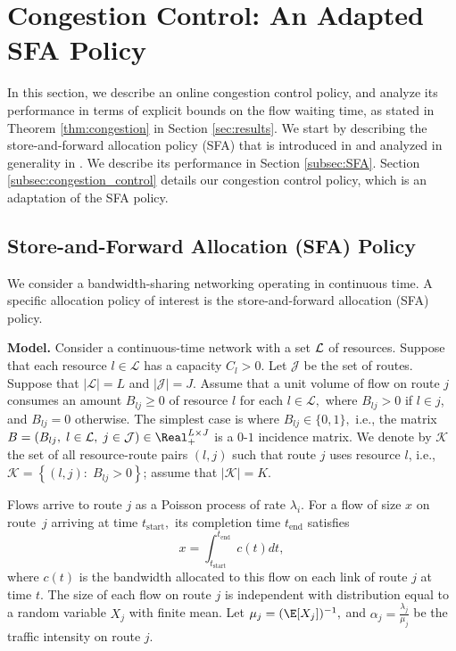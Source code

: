 
\section{Congestion Control: An Adapted SFA Policy \label{sec:congestion_control}}

In this section, we describe an online congestion control policy,
and analyze its performance in terms of explicit bounds on the flow
waiting time, as stated in Theorem \ref{thm:congestion} in Section
\ref{sec:results}. We start by describing the 
store-and-forward allocation policy (SFA) that is introduced in \cite{proutiere_thesis}
and analyzed in generality in \cite{bonald2003insensitive}. We describe
its performance in Section \ref{subsec:SFA}. 
Section \ref{subsec:congestion_control} details our congestion control 
policy, which is an adaptation of the SFA policy.

\subsection{Store-and-Forward Allocation (SFA) Policy\label{subsec:SFA}}

We consider a bandwidth-sharing networking operating in continuous
time. A specific allocation policy of interest is the store-and-forward
allocation (SFA) policy. 

\medskip
\noindent\textbf{Model. }Consider a continuous-time network with a set $\text{\ensuremath{\mathcal{L}}}$
of resources. Suppose that each resource $l\in\mathcal{\mathcal{L}}$
has a capacity $C_{l}>0.$ Let $\mathcal{J}$ be the set of routes.
Suppose that $|\mathcal{L}|=L$ and $|\mathcal{J}|=J$.
Assume that a unit volume of flow on route $j$ consumes an amount
$B_{lj}\geq0$ of resource $l$ for each $l\in\mathcal{L}, $ where
$B_{lj}>0$ if $l\in j$, and $B_{lj}=0$ otherwise. The simplest
case is where $B_{lj}\in\{0,1\},$ i.e., the matrix $B=(B_{lj},\;l\in\mathcal{L},\;j\in\mathcal{J})\in\Real_{+}^{L\times J}$
is a $0$-$1$ incidence matrix. We denote by $\mathcal{\mathcal{K}}$
the set of all resource-route pairs $(l,j)$ such that route $j$
uses resource $l$, i.e., $\mathcal{K}=\left\{ (l,j):\;B_{lj}>0\right\} $;
assume that $|\mathcal{K}|=K.$

Flows arrive to route $j$ as a Poisson process of rate $\lambda_i$. For a flow of size
$x$ on route~$j$ arriving at time $t_{\text{start}},$ its completion
time $t_{\text{end}}$ satisfies 
\[
x=\int_{t_{\text{start}}}^{t_{\text{end}}}c(t)dt,
\]
where $c(t)$ is the bandwidth allocated to this flow on each link
of route $j$ at time $t.$ The size of each flow on route $j$ is
independent with distribution equal to a random variable $X_{j}$
with finite mean. Let $\mu_{j}=(\E[X_{j}])^{-1},$ and $\alpha_{j}=\frac{\lambda_{j}}{\mu_{j}}$
be the traffic intensity on route $j.$

